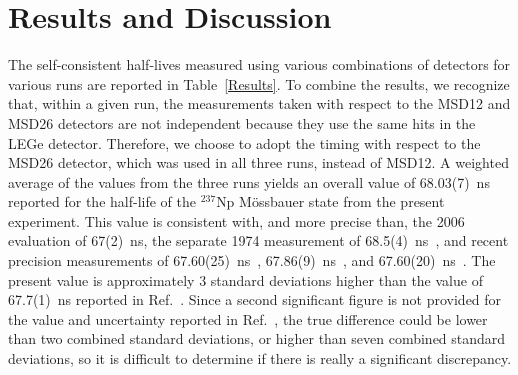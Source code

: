 \documentclass[aps,UTF8,prc,twocolumn,preprintnumbers,amsmath,amssymb,floatfix]{revtex4-2}
\begin{document}



\section{Results and Discussion}

The self-consistent half-lives measured using various combinations of detectors for various runs are reported in Table~\ref{Results}. To combine the results, we recognize that, within a given run, the measurements taken with respect to the MSD12 and MSD26 detectors are not independent because they use the same hits in the LEGe detector. Therefore, we choose to adopt the timing with respect to the MSD26 detector, which was used in all three runs, instead of MSD12. A weighted average of the values from the three runs yields an overall value of 68.03(7)~ns reported for the half-life of the $^{237}$Np M\"{o}ssbauer state from the present experiment. This value is consistent with, and more precise than, the 2006 evaluation of 67(2)~ns, the separate 1974 measurement of 68.5(4)~ns~\cite{Bishop_NIM1974}, and recent precision measurements of 67.60(25)~ns~\cite{Dutsov_ARI2021}, 67.86(9)~ns~\cite{Takacs_ARI2021}, and 67.60(20)~ns~\cite{Santos_NPA2023}. The present value is approximately 3 standard deviations higher than the value of 67.7(1)~ns reported in Ref.~\cite{Vretenar_AJP2019}. Since a second significant figure is not provided for the value and uncertainty reported in Ref.~\cite{Vretenar_AJP2019}, the true difference could be lower than two combined standard deviations, or higher than seven combined standard deviations, so it is difficult to determine if there is really a significant discrepancy.
\end{document}
